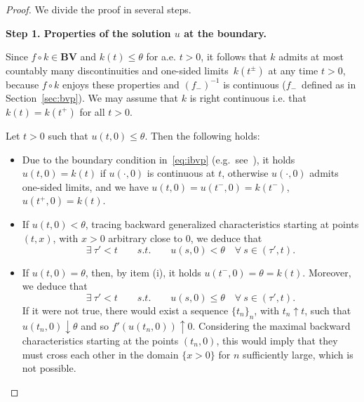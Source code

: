 \documentclass[a4paper, 10pt, final]{article}
\begin{document}
\begin{proof}
  We divide the proof in several steps.  \smallskip

  \noindent
  {\bf Step 1. Properties of the solution $u$ at the boundary.}

  Since $f\circ k\in \mathbf{BV}$ and $k (t)\le \theta$ for a.e. $t > 0$, it follows that
  $k$ admits
  at most countably many discontinuities and one-sided limits~$k(t^\pm)$ at any time $t>0$, because 
  $f\circ k$ enjoys these properties and $(f_-)^{-1}$ is continuous
  ($f_-$~defined as in Section~\ref{sec:bvp}).
  We may assume that $k$ is right continuous i.e. that $k(t)=k(t^+)$ for all $t>0$.

  Let $t>0$  such that $u(t,0)\leq \theta$. Then the following holds:  
  \begin{itemize}
  \item[(i)] 
  Due to the  boundary condition in~\eqref{eq:ibvp} (e.g.~see~\cite[Section~2.1]{lf}),  it holds $u(t,0)=k(t)$ if   $u(\cdot, 0)$ is continuous at $t$, otherwise  $u(\cdot, 0)$
  admits one-sided limits, and we have
  $u(t,0)=u(t^-,0)=k(t^-)$, $u(t^+,0)=k(t)$.

  \item[(ii)] If $u(t,0)<\theta$,  tracing backward generalized characteristics 
  starting at  points $(t,x)$, with $x>0$ arbitrary close to $0$, 
  we  deduce that 
  \begin{equation}
      \label{eq:leftext-tau'}
      \exists~\tau'<t\qquad{s.t.}\qquad u(s,0)< \theta\quad\forall~s\in(\tau', t).
  \end{equation}

  \item[(iii)] If $u(t,0)=\theta$, then, by item (i), it holds 
    $u(t^-,0)=\theta=k(t)$. Moreover, we deduce that
    \begin{equation}
      \label{eq:leftext-tau'-2}
      \exists~\tau'<t\qquad{s.t.}\qquad u(s,0)\leq  \theta\quad\forall~s\in(\tau', t).
    \end{equation}
    If it were not true, there would exist  a sequence $\{t_n\}_n$, with 
    $t_n \uparrow t$, such
    that $ u(t_n, 0)\downarrow \theta $   
    and so  $f'(u(t_n,0))\uparrow 0$. Considering the maximal backward characteristics 
    starting at the points $(t_n,0)$, this would imply that they must cross each other in the domain $\{x>0\}$ 
    for $n$ sufficiently large, which is not possible.
  \end{itemize}





\end{proof}
\end{document}
